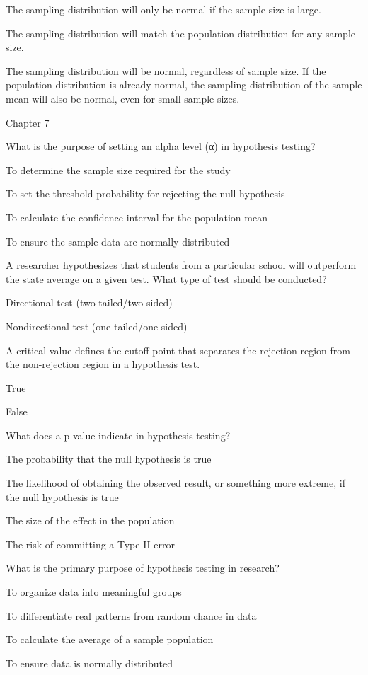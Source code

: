 \documentclass[
  letterpaper,
  DIV=11,
  numbers=noendperiod]{scrreprt}
\begin{document}
The sampling distribution will only be normal if the sample size is
large.

The sampling distribution will match the population distribution for any
sample size.

The sampling distribution will be normal, regardless of sample size. If
the population distribution is already normal, the sampling distribution
of the sample mean will also be normal, even for small sample sizes.

Chapter 7

What is the purpose of setting an alpha level (α) in hypothesis testing?

To determine the sample size required for the study

To set the threshold probability for rejecting the null hypothesis

To calculate the confidence interval for the population mean

To ensure the sample data are normally distributed

A researcher hypothesizes that students from a particular school will
outperform the state average on a given test. What type of test should
be conducted?

Directional test (two-tailed/two-sided)

Nondirectional test (one-tailed/one-sided)

A critical value defines the cutoff point that separates the rejection
region from the non-rejection region in a hypothesis test.

True

False

What does a p value indicate in hypothesis testing?

The probability that the null hypothesis is true

The likelihood of obtaining the observed result, or something more
extreme, if the null hypothesis is true

The size of the effect in the population

The risk of committing a Type II error

What is the primary purpose of hypothesis testing in research?

To organize data into meaningful groups

To differentiate real patterns from random chance in data

To calculate the average of a sample population

To ensure data is normally distributed
\end{document}

